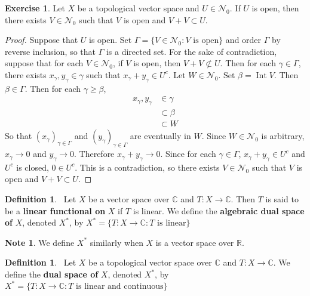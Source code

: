 \documentclass[12pt]{amsart}
\theoremstyle{definition}
\newtheorem{defn}[definition]{Definition}
\newtheorem{note}[definition]{Note}
\newtheorem{ex}[definition]{Exercise}
\newcommand{\gam}{\gamma}
\newcommand{\Gam}{\Gamma}
\newcommand{\be}{\beta}
\newcommand{\C}{\mathbb{C}}
\newcommand{\R}{\mathbb{R}}
\newcommand{\MN}{\mathcal{N}}
\newcommand{\tbf}[1]{\textbf{#1}}
\DeclareMathOperator{\Int}{Int}
\DeclareMathOperator*{\0}{\mbf{0}}
\DeclareMathOperator*{\1}{\mbf{1}}
\newcommand{\ld}[1]{\label{defn:#1}}
\begin{document}
	\begin{ex}
		Let $X$ be a topological vector space and $U \in \MN_0$. If $U$ is open, then there exists $V \in \MN_0$ such that $V$ is open and $V+V \subset U$.
	\end{ex}

	\begin{proof}
		Suppose that $U$ is open. Set $\Gam = \{V \in \MN_0: V \text{ is open}\}$ and order $\Gam$ by reverse inclusion, so that $\Gam$ is a directed set. For the sake of contradiction, suppose that for each $V \in \MN_0$, if $V$ is open, then $V + V \not \subset U$. Then for each $\gam \in \Gam$, there exists $x_{\gam}, y_{\gam} \in \gam$ such that $x_{\gam}+y_{\gam} \in U^c$. Let $W \in \MN_0$. Set $\be = \Int V$. Then $\be \in \Gam$. Then for each $\gam \geq \be$, 
		\begin{align*}
			x_{\gam},y_{\gam} 
			& \in \gam \\
			& \subset \be \\
			& \subset W
		\end{align*}
		So that $(x_{\gam})_{\gam \in \Gam}$ and $(y_{\gam})_{\gam \in \Gam}$ are eventually in $W$. Since $W \in \MN_0$ is arbitrary, $x_{\gam} \rightarrow 0$ and	$y_{\gam} \rightarrow 0$. Therefore $x_{\gam} + y_{\gam} \rightarrow 0$. Since for each $\gam \in \Gam$, $x_{\gam} + y_{\gam} \in U^c$ and $U^c$ is closed, $0 \in U^c$. This is a contradiction, so there exists $V \in \MN_0$ such that $V$ is open and $V+V \subset U$.
		\end{proof}
	

	\begin{defn} \ld{55001}\
		Let $X$ be a vector space over $\C$ and $T :X \rightarrow \C$. Then $T$ is said to be a \tbf{linear functional on} $X$ if $T$ is linear. We define the \tbf{algebraic dual space of} $X$, denoted $X^*$, by $ X^* = \{ T:X \rightarrow \C: T \text{ is linear} \} $
	\end{defn}
	
	\begin{note}
		We define $X^*$ similarly when $X$ is a vector space  over $\R$.
	\end{note}
	
	\begin{defn} \ld{55001}\
		Let $X$ be a topological vector space over $\C$ and $T :X \rightarrow \C$. We define the \tbf{dual space of} $X$, denoted $X^*$, by $ X^* = \{ T:X \rightarrow \C: T \text{ is linear and continuous} \} $
	\end{defn}
	
\end{document}
